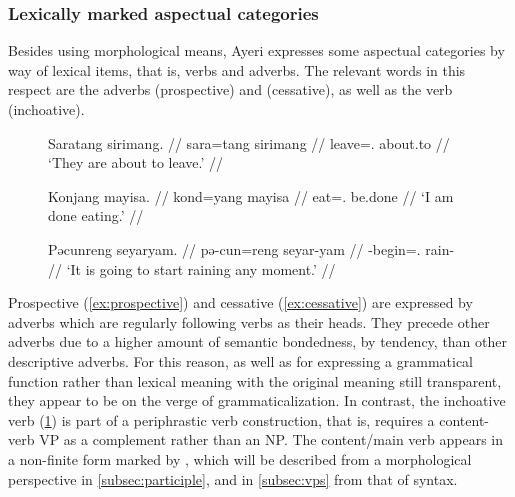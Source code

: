 \subsubsection{Lexically marked aspectual categories}

Besides using morphological means, Ayeri expresses some aspectual categories by
way of lexical items, that is, verbs and adverbs. The relevant words in this
respect are the adverbs  (prospective) and
 (cessative), as well as 
the verb  (inchoative).

\begin{figure}[h]
\pex
\a\label{ex:prospective}
\begingl
	\gla Saratang sirimang. //
	\glb sara=tang sirimang //
	\glc leave=\TplM{}.\Aarg{} about.to //
	\glft `They are about to leave.' //
\endgl

\a\label{ex:cessative}
\begingl
	\gla Konjang mayisa. //
	\glb kond=yang mayisa //
	\glc eat=\Fsg.\Aarg{} be.done //
	\glft `I am done eating.' //
\endgl

\a\label{ex:inchoative}
\begingl
	\gla Pəcunreng seyaryam. //
	\glb pə-cun=reng seyar-yam //
	\glc \NFut{}-begin=\TsgI{}.\Aarg{} rain-\Ptcp{} //
	\glft `It is going to start raining any moment.' //
\endgl
\xe
\end{figure}

Prospective  (\ref{ex:prospective}) and cessative
 (\ref{ex:cessative}) are expressed by adverbs which are
regularly following verbs as their heads. They precede other adverbs due to a
higher amount of semantic bondedness, by tendency, than other descriptive
adverbs. For this reason, as well as for expressing a grammatical function
rather than lexical meaning with the original meaning still transparent, they
appear to be on the verge of grammaticalization. In contrast, the inchoative
verb  (\ref{ex:inchoative}) is part of a periphrastic verb
construction, that is,  requires a content-verb VP as a
complement rather than an NP. The content/main verb appears in a non-finite
form marked by , which will be described from a morphological
perspective in \autoref{subsec:participle}, and in \autoref{subsec:vps} from
that of syntax.


